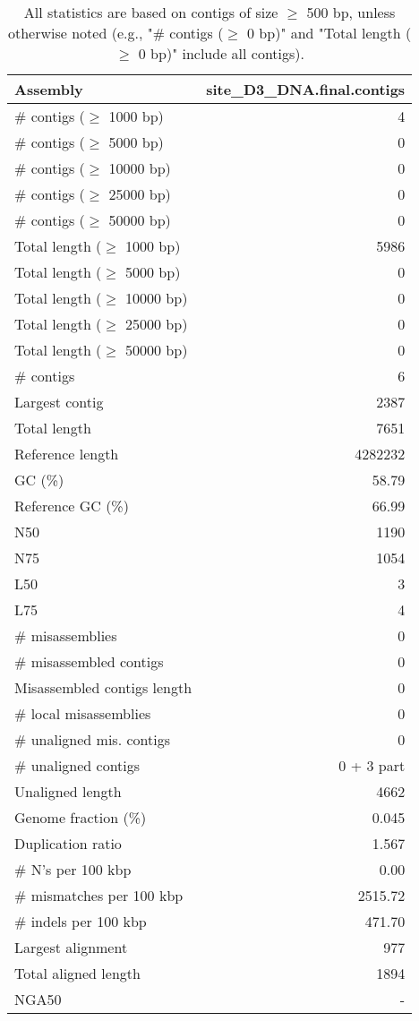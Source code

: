 \documentclass[12pt,a4paper]{article}
\begin{document}
\begin{table}[ht]
\begin{center}
\caption{All statistics are based on contigs of size $\geq$ 500 bp, unless otherwise noted (e.g., "\# contigs ($\geq$ 0 bp)" and "Total length ($\geq$ 0 bp)" include all contigs).}
\begin{tabular}{|l*{1}{|r}|}
\hline
Assembly & site\_D3\_DNA.final.contigs \\ \hline
\# contigs ($\geq$ 1000 bp) & 4 \\ \hline
\# contigs ($\geq$ 5000 bp) & 0 \\ \hline
\# contigs ($\geq$ 10000 bp) & 0 \\ \hline
\# contigs ($\geq$ 25000 bp) & 0 \\ \hline
\# contigs ($\geq$ 50000 bp) & 0 \\ \hline
Total length ($\geq$ 1000 bp) & 5986 \\ \hline
Total length ($\geq$ 5000 bp) & 0 \\ \hline
Total length ($\geq$ 10000 bp) & 0 \\ \hline
Total length ($\geq$ 25000 bp) & 0 \\ \hline
Total length ($\geq$ 50000 bp) & 0 \\ \hline
\# contigs & 6 \\ \hline
Largest contig & 2387 \\ \hline
Total length & 7651 \\ \hline
Reference length & 4282232 \\ \hline
GC (\%) & 58.79 \\ \hline
Reference GC (\%) & 66.99 \\ \hline
N50 & 1190 \\ \hline
N75 & 1054 \\ \hline
L50 & 3 \\ \hline
L75 & 4 \\ \hline
\# misassemblies & 0 \\ \hline
\# misassembled contigs & 0 \\ \hline
Misassembled contigs length & 0 \\ \hline
\# local misassemblies & 0 \\ \hline
\# unaligned mis. contigs & 0 \\ \hline
\# unaligned contigs & 0 + 3 part \\ \hline
Unaligned length & 4662 \\ \hline
Genome fraction (\%) & 0.045 \\ \hline
Duplication ratio & 1.567 \\ \hline
\# N's per 100 kbp & 0.00 \\ \hline
\# mismatches per 100 kbp & 2515.72 \\ \hline
\# indels per 100 kbp & 471.70 \\ \hline
Largest alignment & 977 \\ \hline
Total aligned length & 1894 \\ \hline
NGA50 & - \\ \hline
\end{tabular}
\end{center}
\end{table}
\end{document}
